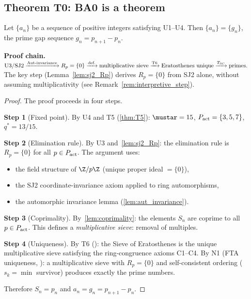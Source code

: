 \documentclass[12pt,a4paper]{article}
\begin{document}
\subsection{Theorem T0: BA0 is a theorem}
\label{sec:ch25_T0}

\mTHM
\begin{theorem}
\label{thm:T0}
Let $\{a_n\}$ be a sequence of positive integers satisfying U1--U4.
Then $\{a_n\} = \{g_n\}$, the prime gap sequence
$g_n = p_{n+1} - p_n$.

\smallskip\noindent\textbf{Proof chain.}
$\text{U3/SJ2} \xrightarrow{\text{Aut-invariance}}
R_p = \{0\} \xrightarrow{\text{def.}}
\text{multiplicative sieve} \xrightarrow{\text{T6}}
\text{Eratosthenes unique} \xrightarrow{T_{\rm SC}}
\text{primes}.$
The key step (Lemma~\ref{lem:sj2_Rp}) derives $R_p = \{0\}$
from SJ2 alone, without assuming multiplicativity (see
Remark~\ref{rem:interpretive_step}).
\end{theorem}

\begin{proof}
The proof proceeds in four steps.

\textbf{Step 1} (Fixed point). By U4 and T5 (\cref{thm:T5}):
$\mustar = 15$, $P_{\rm act} = \{3, 5, 7\}$, $q^* = 13/15$.

\textbf{Step 2} (Elimination rule). By U3 and~\cref{lem:sj2_Rp}:
the elimination rule is $R_p = \{0\}$ for all $p \in P_{\rm act}$.
The argument uses:
\begin{itemize}[nosep]
\item the field structure of $\Z/p\Z$ (unique proper ideal $= \{0\}$),
\item the SJ2 coordinate-invariance axiom applied to ring automorphisms,
\item the automorphic invariance lemma (\cref{lem:aut_invariance}).
\end{itemize}

\textbf{Step 3} (Coprimality). By~\cref{lem:coprimality}: the elements
$S_n$ are coprime to all $p \in P_{\rm act}$. This defines a
\emph{multiplicative sieve}: removal of multiples.

\textbf{Step 4} (Uniqueness). By T6 (\cite{companion_M1}):
the Sieve of Eratosthenes is the unique multiplicative sieve satisfying
the ring-congruence axioms C1--C4. By N1 (FTA uniqueness, \cite{companion_M1}):
a multiplicative sieve with $R_p = \{0\}$
and self-consistent ordering ($s_k = \min$ survivor) produces
exactly the prime numbers.

Therefore $S_n = p_n$ and $a_n = g_n = p_{n+1} - p_n$.
\end{proof}
\end{document}
